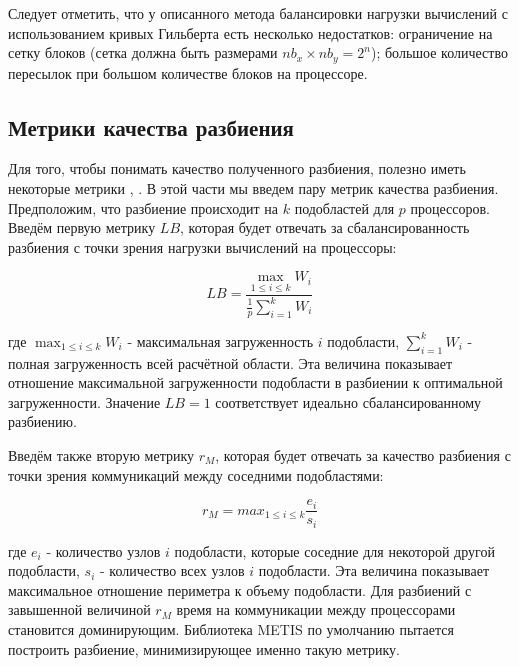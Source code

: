 Следует отметить, что у описанного метода балансировки нагрузки вычислений с использованием кривых Гильберта есть несколько недостатков:
ограничение на сетку блоков (сетка должна быть размерами $nb_x \times nb_y = 2^n$); 
большое количество пересылок при большом количестве блоков на процессоре.

\subsection{Метрики качества разбиения}
\label{sec:ch2/sec3/lb}

Для того, чтобы понимать качество полученного разбиения, полезно иметь некоторые метрики \cite{Dennis2007}, \cite{Hui2017}.
В этой части мы введем пару метрик качества разбиения. Предположим, что разбиение происходит на $k$ подобластей для $p$ процессоров.
Введём первую метрику $LB$, которая будет отвечать за сбалансированность разбиения с точки зрения нагрузки вычислений на процессоры:

\begin{equation} \label{eq:LB}  
    \displaystyle { LB = \frac{\max_{1 \leq i \leq k} W_i}{\frac{1}{p}\sum_{i=1}^k W_i} }
\end{equation} 

где $\max_{1 \leq i \leq k} W_i$ - максимальная загруженность $i$ подобласти, $\sum_{i=1}^k W_i$ - полная загруженность всей расчётной области.
Эта величина показывает отношение максимальной загруженности подобласти в разбиении к оптимальной загруженности.
Значение $LB = 1$ соответствует идеально сбалансированному разбиению. 
    
Введём также вторую метрику $r_M$, которая будет отвечать за качество разбиения с точки зрения коммуникаций между соседними подобластями:

\begin{equation} \label{eq:RM}  
    \displaystyle { r_M = max_{1 \leq i \leq k} \frac{e_i}{s_i} }
\end{equation} 

где $e_i$ - количество узлов $i$ подобласти, которые соседние для некоторой другой подобласти, $s_i$ - количество всех узлов $i$ подобласти.
Эта величина показывает максимальное отношение периметра к объему подобласти. 
Для разбиений с завышенной величиной $r_M$ время на коммуникации между процессорами становится доминирующим.
Библиотека METIS по умолчанию пытается построить разбиение, минимизирующее именно такую метрику.
   
